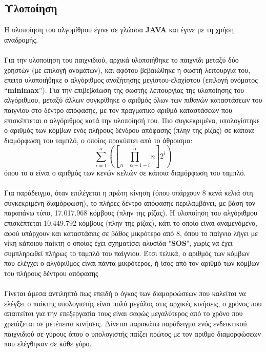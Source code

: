 \documentclass{article}
\begin{document}
\subsection{Υλοποίηση}
Η υλοποίηση του αλγορίθμου έγινε σε γλώσσα \textbf{JAVA} και έγινε με τη χρήση αναδρομής.\\\\
Για την υλοποίηση του παιχνιδιού, αρχικά υλοποιήθηκε το
παιχνίδι μεταξύ δύο χρηστών (με επιλογή ονομάτων), και αφότου βεβαιώθηκε η σωστή λειτουργία του, έπειτα
υλοποιήθηκε ο αλγόριθμος αναζήτησης μεγίστου-ελαχίστου (επιλογή ονόματος “\textbf{minimax}”). Για την επιβεβαίωση της σωστής λειτουργίας της υλοποίησης του αλγόριθμου, μεταξύ άλλων συγκρίθηκε ο αριθμός όλων των πιθανών καταστάσεων του παιγνίου στο δέντρο απόφασης, με τον πραγματικό αριθμό καταστάσεων που επισκέπτεται ο αλγόριθμος κατά την υλοποίησή του. Πιο συγκεκριμένα, υπολογίστηκε ο αριθμός των κόμβων ενός πλήρους δένδρου απόφασης (πλην της ρίζας) σε κάποια διαμόρφωση του ταμπλό, ο οποίος προκύπτει από το άθροισμα: $$\sum_{i=1}^{α}\left(\left[\prod_{n=α+1-i}^{α}n\right]2^{i}\right)$$ όπου το α είναι ο αριθμός των κενών κελιών σε κάποια διαμόρφωση του ταμπλό.\\\\
Για παράδειγμα, όταν επιλέγεται η πρώτη κίνηση (όπου υπάρχουν 8 κενά κελιά στη συγκεκριμένη διαμόρφωση), το πλήρες δέντρο απόφασης περιλαμβάνει, με βάση τον παραπάνω τύπο, 17.017.968 κόμβους (πλην της ρίζας). Η υλοποίηση του αλγόριθμου επισκέπτεται 10.449.792 κόμβους (πλην της ρίζας), κάτι το οποίο είναι αναμενόμενο, αφού υπάρχουν και καταστάσεις σε βάθος μικρότερο από 8, όπου το παίγνιο λήγει με νίκη κάποιου παίκτη ο οποίος έχει σχηματίσει αλυσίδα "\textbf{SOS}", χωρίς να έχει συμπληρωθεί πλήρως το ταμπλό του παίγνιου. Έτσι τελικά, ο αριθμός των κόμβων που ελέγχει ο αλγόριθμος είναι πάντα μικρότερος, ή ίσος από τον αριθμό των κόμβων του πλήρους δέντρου απόφασης \\\\
Γίνεται άμεσα αντιληπτό πως επειδή ο όγκος των διαμορφώσεων που καλείται να ελέγξει ο παίκτης υπολογιστής είναι πολύ μεγάλος στις αρχικές κινήσεις, ο χρόνος που απαιτείται για την επεξεργασία τους είναι σαφώς μεγαλύτερος από το χρόνο που χρειάζεται  σε μετέπειτα κινήσεις. Δίνεται παρακάτω παράδειγμα ενός ενδεικτικού παιχνιδιού σε γύρους όπου ο υπολογιστής παίζει πρώτος με τον αριθμό διαμορφώσεων που ελέγθηκαν σε κάθε γύρο.
\end{document}
